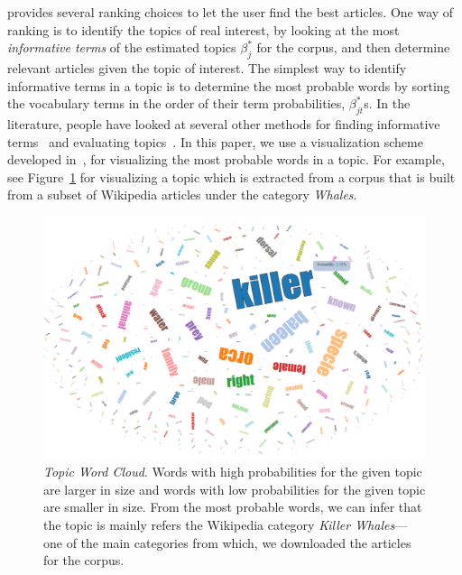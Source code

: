 \system provides several ranking choices to let the user find  
the best articles. One way of ranking is to identify the topics of 
real interest, by looking at the most \textsl{informative terms} of 
the estimated topics $\beta_j^{*}$ for the corpus, and then 
determine relevant articles given the topic of interest. The 
simplest way to identify informative terms in a topic is to 
determine the most probable words by sorting the vocabulary terms in 
the order of their term probabilities, $\beta_{jt}^{*}$s. In the 
literature, people have looked at several other methods for finding 
informative terms~\cite{2012-termite} and evaluating topics~\cite{mimno2011optimizing}. In this paper, we use a visualization scheme 
developed in~\cite{Davis2013}, for visualizing the most probable 
words in a topic. For example, see Figure~\ref{fig:topic-word-cloud} 
for visualizing a topic which is extracted from a corpus that is 
built from a subset of Wikipedia articles under the category 
\textsl{Whales}. 
       
\begin{figure}[htb]\centering 
\includegraphics[width=.9\textwidth]{images/topic_visualization.png}
\caption{\textsl{Topic Word Cloud}. Words with high probabilities for the 
given topic are larger in size and words with low probabilities for 
the given topic are smaller in size. From the most probable words, 
we can infer that the topic is mainly refers the Wikipedia category 
\textit{Killer Whales}---one of the main categories from which, we 
downloaded the articles for the corpus.}
\label{fig:topic-word-cloud}
\end{figure}

